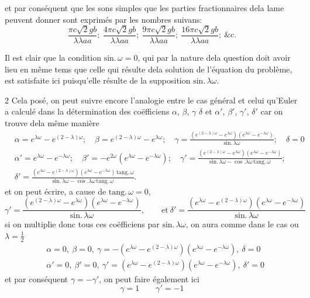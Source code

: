 \documentclass[11pt,a4paper]{article}
\begin{document}
et par conséquent que les sons simples que les parties fractionnaires dela
lame peuvent donner sont exprimés par les nombres suivans:
\[ \frac{\pi c\surd 2gb}{\lambda\lambda aa};\ \frac{4\pi c\surd 2gb}{\lambda\lambda aa};\ \frac{9\pi c\surd 2gb}{\lambda\lambda aa};\ \frac{16\pi c\surd 2gb}{\lambda\lambda aa};\ \text{\&c.} \]

Il est clair que la condition $\text{sin.}\,\omega=0$, qui par la nature dela
question doit avoir lieu en même tems que celle qui résulte dela solution de
l'équation du problème, est satisfaite ici puisqu'elle résulte de la
supposition $\text{sin.}\,\lambda\omega$.

2 Cela posé, on peut suivre encore l'analogie entre le cas général et celui
qu'Euler a calculé dans la détermination des coëfficiens $\alpha$, $\beta$,
$\gamma$ $\delta$ et $\alpha'$, $\beta'$, $\gamma'$, $\delta'$ car on trouve
dela même manière
\begin{align*}
&\alpha=e^{\lambda\omega}-e^{(2-\lambda)\omega};\quad \beta=e^{(2-\lambda)\omega}-e^{\lambda\omega};\quad \gamma=\frac{(e^{(2-\lambda)\omega}-e^{\lambda\omega})(e^{\lambda\omega}-e^{-\lambda\omega})}{\text{sin.}\,\lambda\omega};\quad \delta=0 \\
&\alpha'=e^{\lambda\omega}-e^{-\lambda\omega};\quad \beta'=-e^{2\omega}(e^{\lambda\omega}-e^{-\lambda\omega});\quad \gamma'=\frac{(e^{(2-\lambda)\omega}-e^{\lambda\omega})(e^{\lambda\omega}-e^{-\lambda\omega})}{\text{sin.}\,\lambda\omega-\cos.\lambda\omega\,\text{tang.}\,\omega}; \\
&\delta'=\frac{(e^{\lambda\omega}-e^{(2-\lambda)\omega})(e^{\lambda\omega}-e^{-\lambda\omega})\,\text{tang.}\,\omega}{\text{sin.}\,\lambda\omega-\cos.\lambda\omega\,\text{tang.}\,\omega}.
\end{align*}
et on peut écrire, a cause de $\text{tang.}\,\omega=0$,
\[ \gamma'=\frac{(e^{(2-\lambda)\omega}-e^{\lambda\omega})(e^{\lambda\omega}-e^{-\lambda\omega})}{\text{sin.}\,\lambda\omega},\qquad \text{et}\ \delta'=\frac{(e^{\lambda\omega}-e^{(2-\lambda)\omega})(e^{\lambda\omega}-e^{-\lambda\omega})}{\text{sin.}\,\lambda\omega} \]
si on multiplie donc tous ces coëfficiens par $\text{sin.}\,\lambda\omega$,
on aura comme dans le cas ou $\lambda=\frac{1}{2}$
\begin{align*}
&\alpha=0,\ \beta=0,\ \gamma=-(e^{\lambda\omega}-e^{(2-\lambda)\omega})(e^{\lambda\omega}-e^{-\lambda\omega}),\ \delta=0 \\
&\alpha'=0,\ \beta'=0,\ \gamma'=(e^{\lambda\omega}-e^{(2-\lambda)\omega})(e^{\lambda\omega}-e^{-\lambda\omega}),\ \delta'=0
\end{align*}
et par conséquent $\gamma=-\gamma'$, on peut faire également ici
\[ \gamma=1\qquad \gamma'=-1 \]
\end{document}
